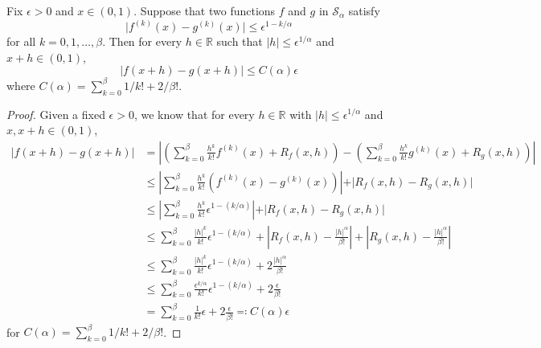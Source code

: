 \begin{lemma}\label{lma:Holder-smooth-3}
	Fix \(\epsilon  > 0\) and \(x \in (0, 1)\). Suppose that two functions \(f\) and \(g\) in \(\mathcal{S} _{\alpha }\) satisfy
	\[
		\vert f^{(k)} (x) - g^{(k)} (x) \vert \leq \epsilon ^{1 - k / \alpha }
	\]
	for all \(k = 0, 1, \dots , \beta \). Then for every \(h\in \mathbb{R} \) such that \(\vert h \vert \leq \epsilon ^{1 / \alpha }\) and \(x + h \in (0, 1)\),
	\[
		\vert f(x+h) - g(x+h) \vert \leq C(\alpha ) \epsilon
	\]
	where \(C(\alpha ) = \sum_{k=0}^{\beta } 1 / k! + 2 / \beta !\).
\end{lemma}
\begin{proof}
	Given a fixed \(\epsilon > 0\), we know that for every \(h\in \mathbb{R} \) with \(\vert h \vert \leq \epsilon ^{1 / \alpha }\) and \(x, x + h \in (0, 1)\),
	\[
		\begin{split}
			\vert f(x+h) - g(x+h) \vert
			 & = \left\vert \left( \sum_{k=0}^{\beta } \frac{h^k}{k!}f^{(k)}(x) + R_f(x, h) \right) - \left( \sum_{k=0}^{\beta } \frac{h^k}{k!}g^{(k)}(x) + R_g(x, h) \right) \right\vert                                                                \\
			 & \leq \left\vert \sum_{k=0}^{\beta } \frac{h^k}{k!}(f^{(k)}(x) - g^{(k)}(x)) \right\vert + \vert R_f(x, h) - R_g(x, h) \vert                                                                                                               \\
			 & \leq \left\vert \sum_{k=0}^{\beta } \frac{h^k}{k!} \epsilon ^{1 - (k / \alpha )} \right\vert + \vert R_f(x, h) - R_g(x, h) \vert                                                                                                          \\
			 & \leq \sum_{k=0}^{\beta } \frac{\vert h \vert ^k}{k!} \epsilon ^{1 - (k / \alpha )} + \left\vert R_f(x, h) - \frac{\vert h \vert ^\alpha }{\beta !} \right\vert + \left\vert R_g(x, h) - \frac{\vert h \vert ^\alpha }{\beta !}\right\vert \\
			 & \leq \sum_{k=0}^{\beta } \frac{\vert h \vert ^k}{k!} \epsilon ^{1 - (k / \alpha )} + 2 \frac{\vert h \vert ^\alpha }{\beta !}                                                                                                             \\
			 & \leq \sum_{k=0}^{\beta } \frac{\epsilon ^{k / \alpha }}{k!} \epsilon ^{1 - (k / \alpha )} + 2 \frac{\epsilon }{\beta !}                                                                                                                   \\
			 & = \sum_{k=0}^{\beta } \frac{1}{k!} \epsilon + 2 \frac{\epsilon}{\beta !}
			\eqqcolon C(\alpha ) \epsilon
		\end{split}
	\]
	for \(C(\alpha ) = \sum_{k=0}^{\beta } 1 / k! + 2 / \beta! \).
\end{proof}


